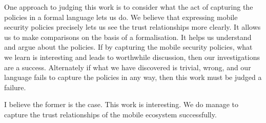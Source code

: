 \documentclass[thesis.tex]{subfiles}
\begin{document}
One approach to judging this work is to consider what the act of capturing the policies in a formal language lets us do.
We believe that expressing mobile security policies precisely lets us see the trust relationships more clearly.
It allows us to make comparisons on the basis of a formalisation.
It helps us understand and argue about the policies.
If by capturing the mobile security policies, what we learn is interesting and leads to worthwhile discussion, then our investigations are a success.
Alternately if what we have discovered is trivial, wrong, and our language
fails to capture the policies in any way, then this work must be judged a failure.

I believe the former is the case.  This work is interesting. We do manage to
capture the trust relationships of the mobile ecosystem successfully.
\end{document}

